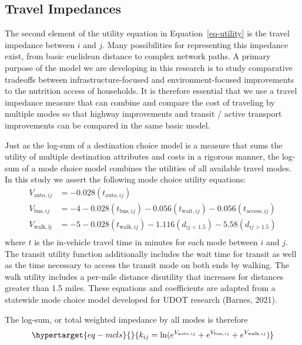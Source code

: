 \documentclass[
  letterpaper,
  DIV=11,
  numbers=noendperiod]{scrreport}
\begin{document}
\hypertarget{sec-mcls}{%
\subsection{Travel Impedances}\label{sec-mcls}}

The second element of the utility equation in Equation~\ref{eq-utility}
is the travel impedance between \(i\) and \(j\). Many possibilities for
representing this impedance exist, from basic euclidean distance to
complex network paths. A primary purpose of the model we are developing
in this research is to study comparative tradeoffs between
infrastructure-focused and environment-focused improvements to the
nutrition access of households. It is therefore essential that we use a
travel impedance measure that can combine and compare the cost of
traveling by multiple modes so that highway improvements and transit /
active transport improvements can be compared in the same basic model.

Just as the log-sum of a destination choice model is a measure that sums
the utility of multiple destination attributes and costs in a rigorous
manner, the log-sum of a mode choice model combines the utilities of all
available travel modes. In this study we assert the following mode
choice utility equations: \begin{align*} 
  V_{\mathrm{auto}, ij} &= -0.028(t_{\mathrm{auto}, ij})\\
  V_{\mathrm{bus}, ij} &= -4 -0.028(t_{\mathrm{bus}, ij}) -0.056(t_{\mathrm{wait}, ij}) -0.056(t_{\mathrm{access}, ij})\\
  V_{\mathrm{walk, ij}} &= -5 -0.028(t_{\mathrm{walk}, ij}) -1.116(d_{ij<1.5}) -5.58(d_{ij>1.5})\\
\end{align*} where \(t\) is the in-vehicle travel time in minutes for
each mode between \(i\) and \(j\). The transit utility function
additionally includes the wait time for transit as well as the time
necessary to access the transit mode on both ends by walking. The walk
utility includes a per-mile distance disutility that increases for
distances greater than 1.5 miles. These equations and coefficients are
adapted from a statewide mode choice model developed for UDOT research
(Barnes, 2021).

The log-sum, or total weighted impedance by all modes is therefore
\begin{equation}\protect\hypertarget{eq-mcls}{}{
k_{ij} = \ln(e^{V_{\mathrm{auto}, ij}} + e^{V_{\mathrm{bus}, ij}} + e^{V_{\mathrm{walk},ij}})
}\label{eq-mcls}\end{equation}
\end{document}
